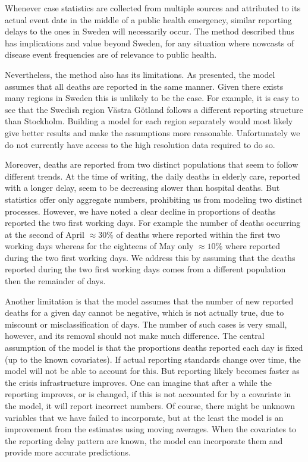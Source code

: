 \documentclass[a4paper,11pt,article,oneside,openany,american]{memoir}
\begin{document}
Whenever case statistics are collected from multiple sources and attributed to its actual event date in the middle of a public health emergency, similar reporting delays to the ones in Sweden will necessarily occur. The method described thus has implications and value beyond Sweden, for any situation where nowcasts of disease event frequencies are of relevance to public health.

Nevertheless, the method also has its limitations. As presented, the model assumes that all deaths are reported in the same manner. Given there exists many regions in Sweden this is unlikely to be the case. For example, it is easy to see that the Swedish region Västra Götland follows a different reporting structure than Stockholm. Building a model for each region separately would most likely give better results and make the assumptions more reasonable. Unfortunately we do not currently have access to the high resolution data required to do so. 



Moreover, deaths are reported from two distinct populations that seem to follow different trends. At the time of writing, the daily deaths in elderly care, reported with a longer delay, seem to be decreasing slower than hospital deaths. But statistics offer only aggregate numbers, prohibiting us from modeling two distinct processes. However, we have noted a clear decline in proportions of deaths reported the two first working days. For example the number of deaths occurring at the second of April $\approx 30\%$ of deaths where reported within the first two working days whereas for the eighteens of May only $\approx 10\%$ where reported during the two first working days. We address this by assuming that the deaths reported during the two first working days comes from a different population then the remainder of days.

Another limitation is that the model assumes that the number of new reported deaths for a given day cannot be negative, which is not actually true, due to miscount or misclassification of days. The number of such cases is very small, however, and its removal should not make much difference. The central assumption of the model is that the proportions deaths reported each day is fixed (up to the known covariates). If actual reporting standards change over time, the model will not be able to account for this. But reporting likely becomes faster as the crisis infrastructure improves. One can imagine that after a while the reporting improves, or is changed, if this is not accounted for by a covariate in the model, it will report incorrect numbers. Of course, there might be unknown variables that we have failed to incorporate, but at the least the model is an improvement from the estimates using moving averages. When the covariates to the reporting delay pattern are known, the model can incorporate them and provide more accurate predictions. 
\end{document}
